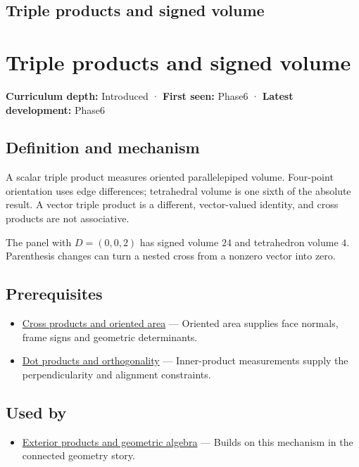 \hypertarget{appendix-5caa058bd9c7}{}
\section*{Triple products and signed volume}
\chapter{Triple products and signed volume}\label{appendix-5caa058bd9c7-triple-products-and-signed-volume}

\textbf{Curriculum depth:} Introduced · \textbf{First seen:} Phase6 · \textbf{Latest development:} Phase6

\section{Definition and mechanism}\label{appendix-5caa058bd9c7-definition-and-mechanism}

A scalar triple product measures oriented parallelepiped volume. Four-point orientation uses edge differences; tetrahedral volume is one sixth of the absolute result. A vector triple product is a different, vector-valued identity, and cross products are not associative.

The panel with \(D=(0,0,2)\) has signed volume \(24\) and tetrahedron volume \(4\). Parenthesis changes can turn a nested cross from a nonzero vector into zero.

\section{Prerequisites}\label{appendix-5caa058bd9c7-prerequisites}

\begin{itemize}
\tightlist
\item
  \hyperref[appendix-2391db8052b1]{Cross products and oriented area} --- Oriented area supplies face normals, frame signs and geometric determinants.
\item
  \hyperref[appendix-8bc4e8fc547c]{Dot products and orthogonality} --- Inner-product measurements supply the perpendicularity and alignment constraints.
\end{itemize}

\section{Used by}\label{appendix-5caa058bd9c7-used-by}

\begin{itemize}
\tightlist
\item
  \hyperref[appendix-e1960925d1b8]{Exterior products and geometric algebra} --- Builds on this mechanism in the connected geometry story.
\end{itemize}

